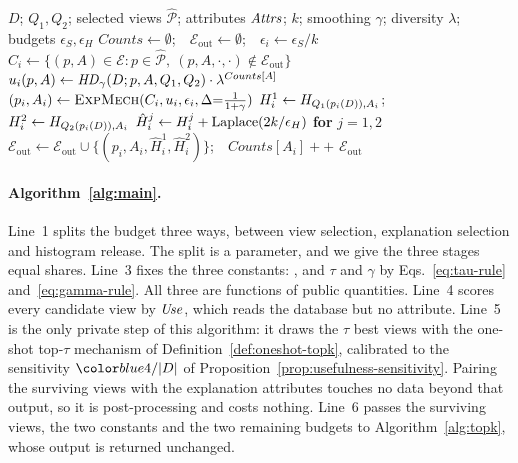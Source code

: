 \begin{algorithm}[t]
\caption{Find-Top-$k$-Explanations}
\label{alg:topk}
\begin{algorithmic}[1]
\Require $D$; $Q_1,Q_2$; selected views $\widehat{\mathcal{P}}$; attributes $\mathit{Attrs}$; $k$; smoothing $\gamma$; diversity $\lambda$; budgets $\epsilon_S,\epsilon_H$
\State $Counts\gets\emptyset$;\ \ $\mathcal{E}_{\mathrm{out}}\gets\emptyset$;\ \ $\epsilon_i \gets \epsilon_S/k$
  \State $C_i \gets \{(p,A)\in\mathcal{E}: p\in\widehat{\mathcal{P}},\ (p,A,\cdot,\cdot)\notin\mathcal{E}_{\mathrm{out}}\}$
  \State $u_i(p,A)\gets \mathit{HD}_{\gamma}(D;p,A,Q_1,Q_2)\cdot \lambda^{Counts[A]}$
  \State $(p_i,A_i)\gets \textsc{ExpMech}(C_i,u_i,\epsilon_i,\Delta{=}\tfrac{1}{1+\gamma})$
  \State $H^1_i\gets H_{Q_1(p_i(D)),A_i}$;\ \ $H^2_i\gets H_{Q_2(p_i(D)),A_i}$
  \State $\hat H^j_i\gets H^j_i+\operatorname{Laplace}(2k/\epsilon_H)$ \textbf{for} $j=1,2$
  \State $\mathcal{E}_{\mathrm{out}}\gets\mathcal{E}_{\mathrm{out}}\cup\{(p_i,A_i,\hat H^1_i,\hat H^2_i)\}$;\ \ $Counts[A_i]{+}{+}$
\EndFor
\State \Return $\mathcal{E}_{\mathrm{out}}$
\end{algorithmic}
\end{algorithm}

\paragraph{Algorithm~\ref{alg:main}.}
Line~1 splits the budget three ways, between view selection, explanation selection and histogram release.
The split is a parameter, and we give the three stages equal shares.
Line~3 fixes the three constants: , and $\tau$ and $\gamma$ by Eqs.~\eqref{eq:tau-rule} and~\eqref{eq:gamma-rule}. All three are functions of public quantities.
Line~4 scores every candidate view by $\mathit{Use}$, which reads the database but no attribute.
Line~5 is the only private step of this algorithm: it draws the $\tau$ best views with the one-shot top-$\tau$ mechanism of Definition~\ref{def:oneshot-topk}, calibrated to the sensitivity $\added{4/|D|}$ of Proposition~\ref{prop:usefulness-sensitivity}.
Pairing the surviving views with the explanation attributes touches no data beyond that output, so it is post-processing and costs nothing.
Line~6 passes the surviving views, the two constants and the two remaining budgets to Algorithm~\ref{alg:topk}, whose output is returned unchanged.

